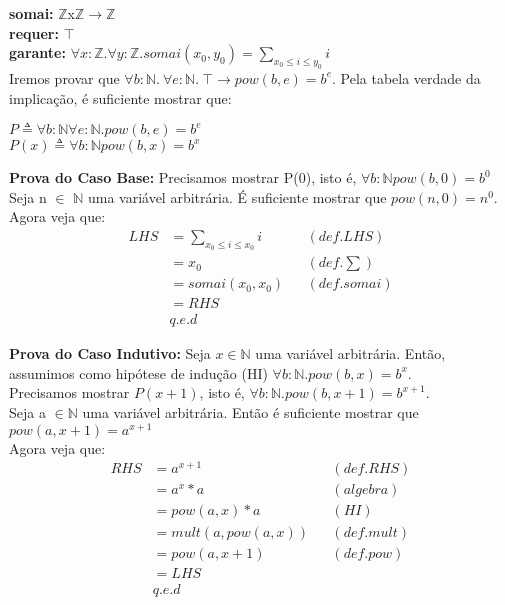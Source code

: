 \documentclass{article}
\begin{document}
\noindent \textbf{somai:} $\mathbb{Z}$x$\mathbb{Z}$$ \rightarrow \mathbb{Z}$\\
\textbf{requer:} $\top$ \\
\textbf{garante:} $\forall x:\mathbb{Z}. \forall y:\mathbb{Z}. somai(x_0,y_0) = \sum\limits_{x_0 \le i \le y_0} i$\\

\noindent Iremos provar que $\forall b:\mathbb{N}.\:\forall e:\mathbb{N}.\:\top\rightarrow pow(b, e) = b^e$.
Pela tabela verdade da implicação, é suficiente mostrar que:

\begin{center}
$P \triangleq \forall b:\mathbb{N} \forall e:\mathbb{N}. pow(b, e) = b^e$ \\
$P(x) \triangleq \forall b:\mathbb{N} pow(b, x) = b^x$ \\
\end{center}

\noindent \textbf{Prova do Caso Base:} Precisamos mostrar P(0), isto é, $\forall b:\mathbb{N} pow(b, 0) = b^0$ \\
Seja n $\in$ $\mathbb{N}$ uma variável arbitrária. É suficiente mostrar que $pow(n, 0) = n^0$. \\
Agora veja que:
\begin{align*}
LHS &= \sum\limits_{x_0 \le i \le x_0} i && (def. LHS) \\
&= x_0 && (def. \sum) \\
&= somai(x_0, x_0) && (def. somai) \\
&= RHS \\
& q.e.d
\end{align*}

\noindent \textbf{Prova do Caso Indutivo:} Seja $x \in \mathbb{N}$ uma variável arbitrária. Então, assumimos como hipótese de indução (HI)
$\forall b:\mathbb{N}. pow(b, x) = b^x$. \\
Precisamos mostrar $P(x+1)$, isto é, $\forall b:\mathbb{N}. pow(b, x+1) = b^{x+1}$. \\
Seja a $\in \mathbb{N}$ uma variável arbitrária. Então é suficiente mostrar que $pow(a, x+1) = a^{x+1}$ \\
Agora veja que:
\begin{align*}
RHS &= a^{x+1} && (def. RHS)\\
&= a^x * a && (algebra)\\
&= pow(a, x) * a && (HI)\\
&= mult(a, pow(a, x)) && (def. mult)\\
&= pow(a, x+1) && (def. pow)\\
&= LHS\\
& q.e.d
\end{align*}
\end{document}
